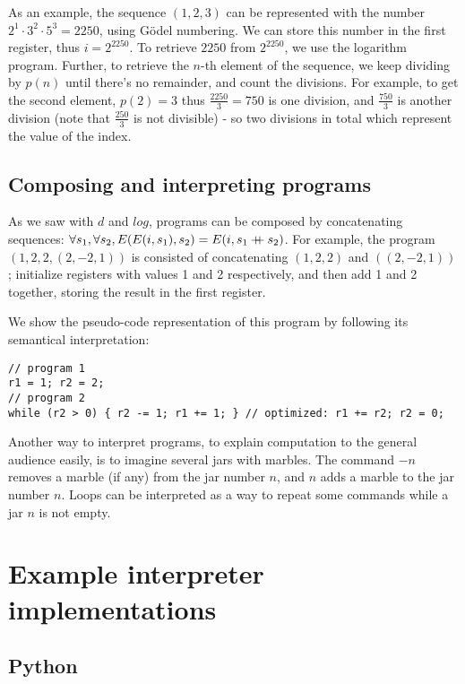 \documentclass{article}
\newcommand\doubleplus{\mathbin{{+}\mspace{-8mu}{+}}}
\begin{document}
As an example, the sequence $(1, 2, 3)$ can be represented with the number $2^1 \cdot 3^2 \cdot 5^3 = 2250$, using Gödel numbering. We can store this number in the first register, thus $i = 2^{2250}$. To retrieve $2250$ from $2^{2250}$, we use the logarithm program. Further, to retrieve the $n$-th element of the sequence, we keep dividing by $p(n)$ until there's no remainder, and count the divisions. For example, to get the second element, $p(2) = 3$ thus $\frac{2250}{3} = 750$ is one division, and $\frac{750}{3}$ is another division (note that $\frac{250}{3}$ is not divisible) - so two divisions in total which represent the value of the index.

\subsection{Composing and interpreting programs}

As we saw with $d$ and $log$, programs can be composed by concatenating sequences: $\forall s_1, \forall s_2, E(E(i, s_1), s_2) = E(i, s_1 \doubleplus s_2)$. For example, the program $(1, 2, 2, (2, -2, 1))$ is consisted of concatenating $(1, 2, 2)$ and $((2, -2, 1))$; initialize registers with values 1 and 2 respectively, and then add 1 and 2 together, storing the result in the first register.

We show the pseudo-code representation of this program by following its semantical interpretation:

\begin{verbatim}
// program 1
r1 = 1; r2 = 2;
// program 2
while (r2 > 0) { r2 -= 1; r1 += 1; } // optimized: r1 += r2; r2 = 0;
\end{verbatim}

Another way to interpret programs, to explain computation to the general audience easily, is to imagine several jars with marbles. The command $-n$ removes a marble (if any) from the jar number $n$, and $n$ adds a marble to the jar number $n$. Loops can be interpreted as a way to repeat some commands while a jar $n$ is not empty.

\section{Example interpreter implementations}

\subsection{Python}
\end{document}
